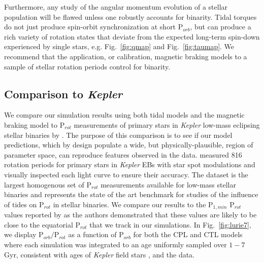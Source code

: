 \documentclass[twocolumn]{aastex61}
\newcommand{\kepler}[0]{\textit{Kepler}\xspace}
\begin{document}
Furthermore, any study of the angular momentum evolution of a stellar population will be flawed unless one robustly accounts for binarity.  Tidal torques do not just produce spin-orbit synchronization at short P$_{orb}$, but can produce a rich variety of rotation states that deviate from the expected long-term spin-down experienced by single stars, e.g. Fig.~\ref{fig:qmap} and Fig.~\ref{fig:taumap}. We recommend that the application, or calibration, magnetic braking models to a sample of stellar rotation periods control for binarity.   


\subsection{Comparison to \kepler} \label{sec:kepler}

We compare our simulation results using both tidal models and the \citet{Matt2015} magnetic braking model to P$_{rot}$ measurements of primary stars in \kepler low-mass eclipsing stellar binaries by \citet{Lurie2017}. The purpose of this comparison is to see if our model predictions, which by design populate a wide, but physically-plausible, region of parameter space, can reproduce features observed in the data.  \citet{Lurie2017} measured 816 rotation periods for primary stars in \kepler EBs with star spot modulations and visually inspected each light curve to ensure their accuracy. The \citet{Lurie2017} dataset is the largest homogenous set of P$_{rot}$ measurements available for low-mass stellar binaries and represents the state of the art benchmark for studies of the influence of tides on P$_{rot}$ in stellar binaries. We compare our results to the P$_{1,min}$ P$_{rot}$ values reported by \citet{Lurie2017} as the authors demonstrated that these values are likely to be close to the equatorial P$_{rot}$ that we track in our simulations. In Fig.~\ref{fig:lurie7}, we display P$_{orb}/$P$_{rot}$ as a function of P$_{orb}$ for both the CPL and CTL models where each simulation was integrated to an age uniformly sampled over $1-7$ Gyr, consistent with ages of \kepler field stars \citep{Chaplin2014}, and the \citet{Lurie2017} data. 
\end{document}
